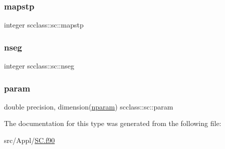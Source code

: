 \mbox{\label{structscclass_1_1sc_ac919c69cd2bb089386f56a5ac75728f0}} 
\subsubsection{\texorpdfstring{mapstp}{mapstp}}
{\footnotesize\ttfamily integer scclass\+::sc\+::mapstp}

\mbox{\label{structscclass_1_1sc_a32cf6178c767aecb2b10b7baa0221c78}} 
\subsubsection{\texorpdfstring{nseg}{nseg}}
{\footnotesize\ttfamily integer scclass\+::sc\+::nseg}

\mbox{\label{structscclass_1_1sc_a21e20d06bda8473fab959e3ee29e5183}} 
\subsubsection{\texorpdfstring{param}{param}}
{\footnotesize\ttfamily double precision, dimension(\mbox{\hyperlink{namespacescclass_a78eec9a89964d83818db291873df4436}{nparam}}) scclass\+::sc\+::param}



The documentation for this type was generated from the following file\+:\begin{DoxyCompactItemize}
\item 
src/\+Appl/\mbox{\hyperlink{_s_c_8f90}{S\+C.\+f90}}\end{DoxyCompactItemize}
